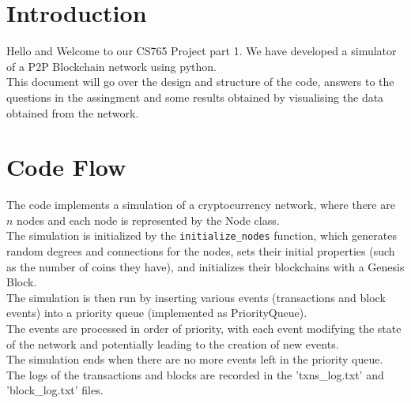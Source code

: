 \documentclass[a4paper,14pt]{article}
\begin{document}

\date{Spring 2023}
\maketitle

\justifying


\justifying

\section*{Introduction}

Hello and Welcome to our CS765 Project part 1. We have developed a simulator of a P2P Blockchain network using python.\\
This document will go over the design and structure of the code, answers to the questions in the assingment and some results obtained by visualising the data obtained from the network.

\section{Code Flow}

The code implements a simulation of a cryptocurrency network, where there are $n$ nodes and each node is represented by the Node class.\\
The simulation is initialized by the \verb|initialize_nodes| function, which generates random degrees and connections for the nodes, sets their initial properties (such as the number of coins they have), and initializes their blockchains with a Genesis Block.\\
The simulation is then run by inserting various events (transactions and block events) into a priority queue (implemented as PriorityQueue).\\
The events are processed in order of priority, with each event modifying the state of the network and potentially leading to the creation of new events.\\
The simulation ends when there are no more events left in the priority queue. The logs of the transactions and blocks are recorded in the 'txns\_log.txt' and 'block\_log.txt' files.
\end{document}
